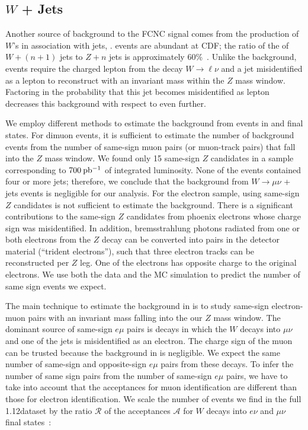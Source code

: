 \subsection[$W$ + Jets]{\boldmath $W$\unboldmath{} + Jets}
Another source of background to the FCNC signal comes from the
production of $W$'s in association with jets, \Wj. \Wj events are 
abundant at CDF; the ratio of the \xsects of $W+(n+1)$ jets to 
$Z+n$ jets is approximately 60\%~\cite{TopXSec}. Unlike
the \Zj background, \Wj events require the charged lepton from 
the decay $W\to\ell\nu$ and a jet misidentified as a lepton to 
reconstruct with an invariant mass within the $Z$ mass window. 
Factoring in the probability that this jet becomes
misidentified as lepton decreases this background with respect to
\Zj even further.

We employ different methods to estimate the background from \Wj events
in \ee and \mm final states.  For dimuon events, it is sufficient to
estimate the number of background events from the number of same-sign
muon pairs (or muon-track pairs) that fall into the $Z$ mass window.
We found only 15 same-sign $Z$ candidates in a sample corresponding to
$700\:\mathrm{pb^{-1}}$ of integrated luminosity. None of the events contained
four or more jets; therefore, we conclude that the background from
$W\rightarrow \mu\nu$ + jets events is negligible for our analysis.  
For the electron sample, using same-sign $Z$ candidates is not sufficient 
to estimate the \Wj background. There is a significant contributions to 
the same-sign $Z$ candidates from phoenix electrons whose charge sign was
misidentified. In addition, bremsstrahlung photons radiated from one
or both electrons from the $Z$ decay can be converted into \ee pairs
in the detector material (``trident electrons''), such that three electron 
tracks can be reconstructed per $Z$ leg. One of the electrons has
opposite charge to the original electrons.  We use both the data and
the MC simulation to predict the number of same sign \Zee events we
expect.

The main technique to estimate the \Wj background in \Zee is to study
same-sign electron-muon pairs with an invariant mass falling into the
our $Z$ mass window.  The dominant source of same-sign $e\mu$ pairs is
\Wj decays in which the $W$ decays into $\mu\nu$ and one of the jets
is misidentified as an electron. The charge sign of the muon can be
trusted because the background in \Zmm is negligible. We expect the
same number of same-sign and opposite-sign $e\mu$ pairs from these
decays. To infer the number of same sign \ee pairs from the number of
same-sign $e\mu$ pairs, we have to take into account that the
acceptances for muon identification are different than those for
electron identification. We scale the number of events we find in the
full 1.12\invfb dataset by the ratio $\mathcal{R}$ of the acceptances
$\mathcal{A}$ for $W$ decays into $e\nu$ and $\mu\nu$ final
states~\cite{Acosta:2004uq}:

